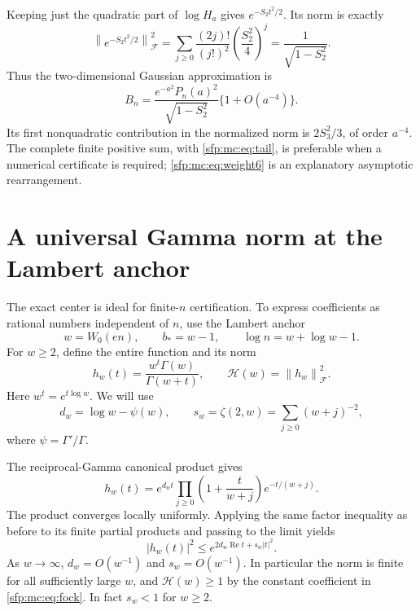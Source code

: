 \documentclass[11pt,letterpaper]{article}
\numberwithin{equation}{section}
\theoremstyle{definition}\newtheorem{definition}[theorem]{Definition}
\theoremstyle{remark}\newtheorem{remark}[theorem]{Remark}
\newcommand{\Fock}[1]{\left\lVert #1\right\rVert_{\mathcal F}^{2}}
\begin{document}
Keeping just the quadratic part of $\log H_a$ gives
$e^{-S_2t^2/2}$. Its norm is exactly
\begin{equation}\label{sfp:mc:eq:gaussian}
 \Fock{e^{-S_2t^2/2}}
 =\sum_{j\geq0}\frac{(2j)!}{(j!)^2}
                  \left(\frac{S_2^2}{4}\right)^j
 =\frac1{\sqrt{1-S_2^2}}.
\end{equation}
Thus the two-dimensional Gaussian approximation is
\begin{equation}\label{sfp:mc:eq:gaussianapprox}
 B_n=\frac{e^{-a^2}P_n(a)^2}{\sqrt{1-S_2^2}}
      \{1+O(a^{-4})\}.
\end{equation}
Its first nonquadratic contribution in the normalized norm is
$2S_3^2/3$, of order $a^{-4}$. The complete finite positive sum,
with \eqref{sfp:mc:eq:tail}, is preferable when a numerical certificate
is required; \eqref{sfp:mc:eq:weight6} is an explanatory asymptotic
rearrangement.

\section{A universal Gamma norm at the Lambert anchor}
\label{sfp:mc:sec:gamma}

The exact center is ideal for finite-$n$ certification. To express
coefficients as rational numbers independent of $n$, use the
Lambert anchor
\begin{equation}\label{sfp:mc:eq:anchor}
 w=W_0(en),\qquad b_*=w-1,\qquad
 \log n=w+\log w-1.
\end{equation}
For $w\geq2$, define the entire function and its norm
\begin{equation}\label{sfp:mc:eq:gammanorm}
 h_w(t)=\frac{w^t\Gamma(w)}{\Gamma(w+t)},\qquad
 \mathcal H(w)=\Fock{h_w}.
\end{equation}
Here $w^t=e^{t\log w}$. We will use
\begin{equation}\label{sfp:mc:eq:gamma-ds}
 d_w=\log w-\psi(w),\qquad
 s_w=\zeta(2,w)=\sum_{j\geq0}(w+j)^{-2},
\end{equation}
where $\psi=\Gamma'/\Gamma$.

The reciprocal-Gamma canonical product gives
\begin{equation}\label{sfp:mc:eq:canonicalgamma}
 h_w(t)=e^{d_wt}
    \prod_{j\geq0}\left(1+\frac{t}{w+j}\right)e^{-t/(w+j)}.
\end{equation}
The product converges locally uniformly. Applying the same factor
inequality as before to its finite partial products and passing to
the limit yields
\begin{equation}\label{sfp:mc:eq:gammaglobal}
 |h_w(t)|^2\leq e^{2d_w\operatorname{Re}t+s_w|t|^2}.
\end{equation}
As $w\to\infty$, $d_w=O(w^{-1})$ and $s_w=O(w^{-1})$.
In particular the norm is finite for all sufficiently large $w$,
and $\mathcal H(w)\geq1$ by the constant coefficient in
\eqref{sfp:mc:eq:fock}. In fact $s_w<1$ for $w\geq2$.
\end{document}
